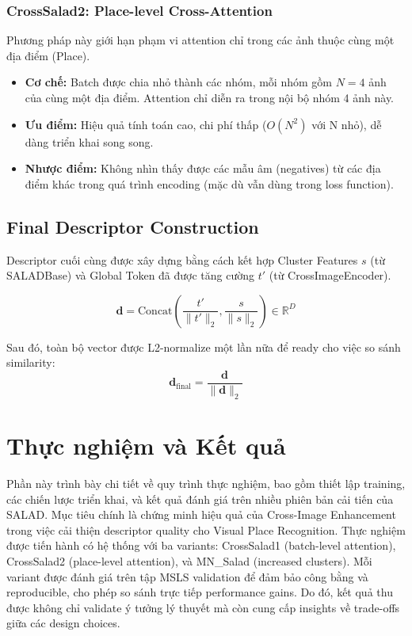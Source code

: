 \documentclass[12pt,a4paper]{article}
\begin{document}
    \subsubsection{CrossSalad2: Place-level Cross-Attention}
    Phương pháp này giới hạn phạm vi attention chỉ trong các ảnh thuộc cùng một địa điểm (Place).
    \begin{itemize}
        \item \textbf{Cơ chế:} Batch được chia nhỏ thành các nhóm, mỗi nhóm gồm $N=4$ ảnh của cùng một địa điểm. Attention chỉ diễn ra trong nội bộ nhóm 4 ảnh này.
        \item \textbf{Ưu điểm:} Hiệu quả tính toán cao, chi phí thấp ($O(N^2)$ với N nhỏ), dễ dàng triển khai song song.
        \item \textbf{Nhược điểm:} Không nhìn thấy được các mẫu âm (negatives) từ các địa điểm khác trong quá trình encoding (mặc dù vẫn dùng trong loss function).
    \end{itemize}

    \subsection{Final Descriptor Construction}

    Descriptor cuối cùng được xây dựng bằng cách kết hợp Cluster Features $s$ (từ SALADBase) và Global Token đã được tăng cường $t'$ (từ CrossImageEncoder).
    
    \begin{equation}
        \mathbf{d} = \text{Concat}\left(\frac{t'}{\|t'\|_2}, \frac{s}{\|s\|_2}\right) \in \mathbb{R}^{D}
    \end{equation}
    
    Sau đó, toàn bộ vector được L2-normalize một lần nữa để ready cho việc so sánh similarity:
    \begin{equation}
        \mathbf{d}_{\text{final}} = \frac{\mathbf{d}}{\|\mathbf{d}\|_2}
    \end{equation}

    \section{Thực nghiệm và Kết quả}

    Phần này trình bày chi tiết về quy trình thực nghiệm, bao gồm thiết lập training, các chiến lược triển khai, và kết quả đánh giá trên nhiều phiên bản cải tiến của SALAD. Mục tiêu chính là chứng minh hiệu quả của Cross-Image Enhancement trong việc cải thiện descriptor quality cho Visual Place Recognition. Thực nghiệm được tiến hành có hệ thống với ba variants: CrossSalad1 (batch-level attention), CrossSalad2 (place-level attention), và MN\_Salad (increased clusters). Mỗi variant được đánh giá trên tập MSLS validation để đảm bảo công bằng và reproducible, cho phép so sánh trực tiếp performance gains. Do đó, kết quả thu được không chỉ validate ý tưởng lý thuyết mà còn cung cấp insights về trade-offs giữa các design choices.
\end{document}

